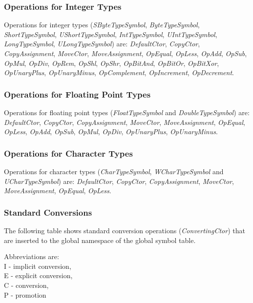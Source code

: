 \documentclass[a4paper,oneside,11pt]{book}
\theoremstyle{definition}
\begin{document}
\subsubsection{Operations for Integer Types}

Operations for integer types (\emph{SByteTypeSymbol}, \emph{ByteTypeSymbol}, \emph{ShortTypeSymbol}, \emph{UShortTypeSymbol}, \emph{IntTypeSymbol},
\emph{UIntTypeSymbol}, \emph{LongTypeSymbol}, \emph{ULongTypeSymbol}) are:
\emph{DefaultCtor}, \emph{CopyCtor}, \emph{CopyAssignment}, \emph{MoveCtor}, \emph{MoveAssignment}, \emph{OpEqual}, \emph{OpLess},
\emph{OpAdd}, \emph{OpSub}, \emph{OpMul}, \emph{OpDiv}, \emph{OpRem}, \emph{OpShl}, \emph{OpShr}, \emph{OpBitAnd}, \emph{OpBitOr}, \emph{OpBitXor},
\emph{OpUnaryPlus}, \emph{OpUnaryMinus}, \emph{OpComplement}, \emph{OpIncrement}, \emph{OpDecrement}.

\subsubsection{Operations for Floating Point Types}

Operations for floating point types (\emph{FloatTypeSymbol} and \emph{DoubleTypeSymbol}) are:
\emph{DefaultCtor}, \emph{CopyCtor}, \emph{CopyAssignment}, \emph{MoveCtor}, \emph{MoveAssignment}, \emph{OpEqual}, \emph{OpLess},
\emph{OpAdd}, \emph{OpSub}, \emph{OpMul}, \emph{OpDiv}, \emph{OpUnaryPlus}, \emph{OpUnaryMinus}.

\subsubsection{Operations for Character Types}

Operations for character types (\emph{CharTypeSymbol}, \emph{WCharTypeSymbol} and \emph{UCharTypeSymbol}) are:
\emph{DefaultCtor}, \emph{CopyCtor}, \emph{CopyAssignment}, \emph{MoveCtor}, \emph{MoveAssignment}, \emph{OpEqual}, \emph{OpLess}.

\subsubsection{Standard Conversions}\label{standardconversions}

The following table shows standard conversion operations (\emph{ConvertingCtor})
that are inserted to the global namespace of the global symbol table.

\begin{flushleft}
Abbreviations are:\\
I - implicit conversion,\\
E - explicit conversion,\\
C - conversion,\\
P - promotion
\end{flushleft}
\end{document}

